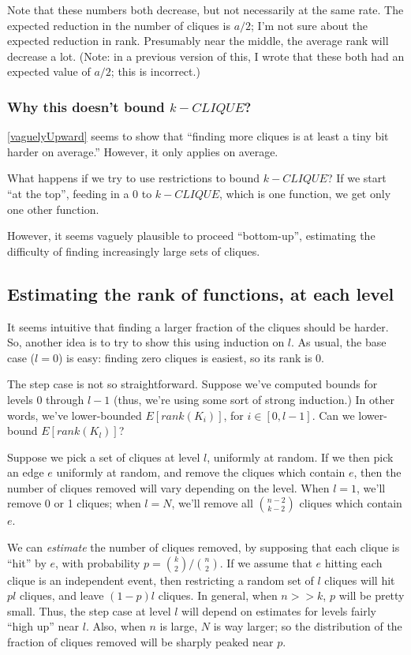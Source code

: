 \documentclass[12pt]{article}
\theoremstyle{definition}
\begin{document}
Note that these numbers both decrease, but not necessarily at the same rate.
The expected reduction in the number of cliques is $a/2$; I'm not sure
about the expected reduction in rank. Presumably near the middle, the
average rank will decrease a lot.
(Note: in a previous version of this, I wrote that these both had an expected
value of $a/2$; this is incorrect.)

\subsubsection{Why this doesn't bound $k-CLIQUE$?}

\ref{vaguelyUpward} seems to show that ``finding more cliques is
at least a tiny bit harder on average.'' However, it only applies
on average.

What happens if we try to use restrictions to bound $k-CLIQUE$?
If we start ``at the top'',
feeding in a 0 to $k-CLIQUE$, which is one function,
we get only one other function.

However, it seems vaguely plausible to proceed ``bottom-up'',
estimating the difficulty of finding increasingly large
sets of cliques.

\subsection{Estimating the rank of functions, at each level}

It seems intuitive that finding a larger fraction of the cliques
should be harder.
So, another idea is to try to show this using induction on $l$.
As usual, the base case ($l=0$) is easy: finding zero cliques is easiest,
so its rank is 0.

The step case is not so straightforward. Suppose we've computed bounds for
levels 0 through $l-1$ (thus, we're using some sort of strong induction.)
In other words, we've lower-bounded $E[rank(K_i)]$, for $i \in [0,l-1]$.
Can we lower-bound $E[rank(K_l)]$?

Suppose we pick a set of cliques at level $l$, uniformly at random.
If we then pick an edge $e$ uniformly at random, and remove the cliques
which contain $e$, then the number of cliques removed will vary
depending on the level. When $l=1$, we'll remove 0 or 1 cliques; when $l=N$,
we'll remove all ${n-2 \choose k-2}$ cliques which contain $e$.

We can {\em estimate} the number of cliques removed, by supposing that each
clique is ``hit'' by $e$, with probability $p = {k \choose 2} / {n \choose 2}$.
If we assume that $e$ hitting each clique is an independent event, then
restricting a random set of $l$ cliques will hit $pl$ cliques, and
leave $(1-p)l$ cliques.
In general, when $n>>k$, $p$ will be pretty small. Thus, the step case at
level $l$ will depend on estimates for levels fairly ``high up'' near $l$.
Also, when $n$ is large, $N$ is way larger; so the distribution of
the fraction of cliques removed will be sharply peaked near $p$.
\end{document}
